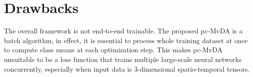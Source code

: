 
\section{Drawbacks} \label{sec:drawbacks}
    The overall framework is not end-to-end trainable.
    The proposed pc-MvDA is a batch algorithm, in effect, it is essential to process whole training dataset at once to compute class means at each optimization step.
    This makes pc-MvDA unsuitable to be a loss function that trains multiple large-scale neural networks concurrently, especially when input data is 3-dimensional spatio-temporal tensors.
    